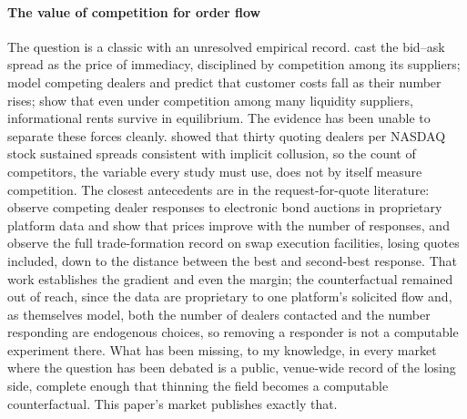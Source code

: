 \documentclass[11pt]{article}
\theoremstyle{plain}
\theoremstyle{definition}
\theoremstyle{remark}
\begin{document}
\paragraph{The value of competition for order flow} The question is a classic with an unresolved empirical record. \citet{demsetz1968cost} cast the bid--ask spread as the price of immediacy, disciplined by competition among its suppliers; \citet{ho1983dynamics} model competing dealers and predict that customer costs fall as their number rises; \citet{biais2000competing} show that even under competition among many liquidity suppliers, informational rents survive in equilibrium. The evidence has been unable to separate these forces cleanly. \citet{christie1994nasdaq} showed that thirty quoting dealers per NASDAQ stock sustained spreads consistent with implicit collusion, so the count of competitors, the variable every study must use, does not by itself measure competition. The closest antecedents are in the request-for-quote literature: \citet{hendershott2015click} observe competing dealer responses to electronic bond auctions in proprietary platform data and show that prices improve with the number of responses, and \citet{riggs2020swap} observe the full trade-formation record on swap execution facilities, losing quotes included, down to the distance between the best and second-best response. That work establishes the gradient and even the margin; the counterfactual remained out of reach, since the data are proprietary to one platform's solicited flow and, as \citet{hendershott2015click} themselves model, both the number of dealers contacted and the number responding are endogenous choices, so removing a responder is not a computable experiment there. What has been missing, to my knowledge, in every market where the question has been debated is a public, venue-wide record of the losing side, complete enough that thinning the field becomes a computable counterfactual. This paper's market publishes exactly that.
\end{document}
